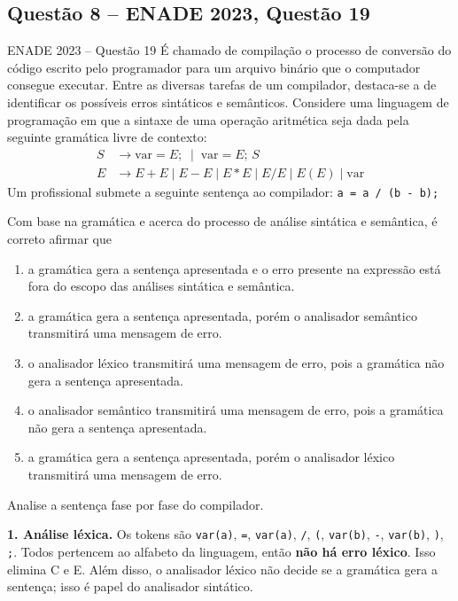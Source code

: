 \documentclass[11pt,a4paper]{article}
\newcommand{\solucao}{\par\medskip\noindent{\large\bfseries\color{verde}Solução}\par\smallskip}
\begin{document}
\subsection{Questão 8 -- ENADE 2023, Questão 19}
\begin{enunciado}{ENADE 2023 -- Questão 19}
É chamado de compilação o processo de conversão do código escrito pelo programador para um arquivo
binário que o computador consegue executar. Entre as diversas tarefas de um compilador, destaca-se a
de identificar os possíveis erros sintáticos e semânticos. Considere uma linguagem de programação em
que a sintaxe de uma operação aritmética seja dada pela seguinte gramática livre de contexto:
\[
\begin{aligned}
S &\to \textrm{var} = E; \;\mid\; \textrm{var} = E;\, S\\
E &\to E + E \mid E - E \mid E * E \mid E / E \mid E(E) \mid \textrm{var}
\end{aligned}
\]
Um profissional submete a seguinte sentença ao compilador: \qquad \texttt{a = a / (b - b);}

\smallskip
Com base na gramática e acerca do processo de análise sintática e semântica, é correto afirmar que
\begin{enumerate}[label=\Alph*)]
  \item a gramática gera a sentença apresentada e o erro presente na expressão está fora do escopo das
  análises sintática e semântica.
  \item a gramática gera a sentença apresentada, porém o analisador semântico transmitirá uma mensagem de erro.
  \item o analisador léxico transmitirá uma mensagem de erro, pois a gramática não gera a sentença apresentada.
  \item o analisador semântico transmitirá uma mensagem de erro, pois a gramática não gera a sentença apresentada.
  \item a gramática gera a sentença apresentada, porém o analisador léxico transmitirá uma mensagem de erro.
\end{enumerate}
\end{enunciado}

\solucao
Analise a sentença fase por fase do compilador.

\textbf{1. Análise léxica.} Os tokens são \texttt{var(a)}, \texttt{=}, \texttt{var(a)}, \texttt{/},
\texttt{(}, \texttt{var(b)}, \texttt{-}, \texttt{var(b)}, \texttt{)}, \texttt{;}. Todos pertencem ao
alfabeto da linguagem, então \textbf{não há erro léxico}. Isso elimina C e E. Além disso, o analisador
léxico não decide se a gramática gera a sentença; isso é papel do analisador sintático.
\end{document}
